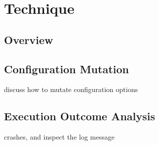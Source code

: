 
\section{Technique}

\subsection{Overview}

\subsection{Configuration Mutation}

discuss how to mutate configuration options


\subsection{Execution Outcome Analysis}

crashes, and inspect the log message
